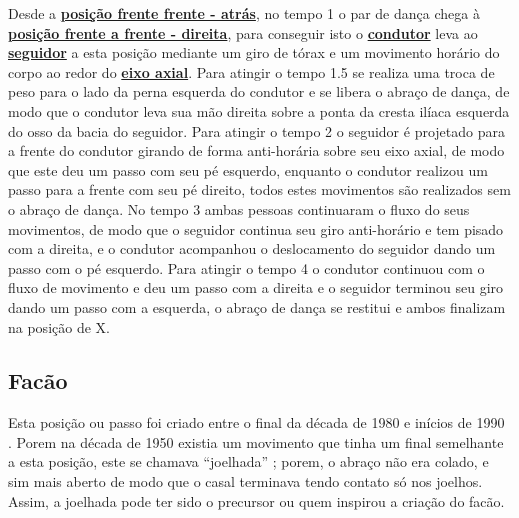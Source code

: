 Desde a \hyperref[def:ffa-position]{\textbf{posição frente frente - atrás}},
no tempo 1 o par de dança chega à \hyperref[def:ffd-position]{\textbf{posição frente a frente - direita}},
para conseguir isto o \hyperref[def:Condutor]{\textbf{condutor}} 
leva ao \hyperref[def:Seguidor]{\textbf{seguidor}} a esta posição
 mediante um giro de tórax e um movimento horário do corpo 
ao redor do \hyperref[def:EixoAxial]{\textbf{eixo axial}}.
Para atingir o tempo 1.5 se realiza uma troca de peso para o lado da perna esquerda do condutor
e se libera o abraço de dança, de modo que o condutor leva sua mão direita
sobre a ponta da cresta ilíaca esquerda do osso da bacia do seguidor.
Para atingir o tempo 2 o seguidor é projetado para a frente do condutor 
girando de forma anti-horária sobre seu eixo axial, de modo que este deu um passo 
com seu pé esquerdo, enquanto o condutor realizou um passo para a frente com seu pé direito,
todos estes movimentos são realizados sem o abraço de dança.
No tempo 3 ambas pessoas continuaram o fluxo do seus movimentos,
de modo que o seguidor continua seu giro anti-horário e tem pisado com a direita,
e o condutor acompanhou o deslocamento do seguidor dando um passo com o pé esquerdo.
Para atingir o tempo 4 o condutor continuou com o fluxo de movimento e deu 
um passo com a direita e o seguidor terminou seu giro dando um passo com a esquerda,
o abraço de dança se restitui e ambos finalizam na posição de X.

\subsection{Facão}
\label{subsec:desc:passo:facao}

\caracterpostura{\CheckedItem}{\NoCheckedItem}
Esta posição ou passo foi  criado entre o final da década de 1980 e inícios de 1990  \cite[pp. 143]{perna2002samba}.
Porem na década de 1950 existia um movimento que tinha um final semelhante a esta posição, 
este se chamava ``joelhada'' \cite[pp. 160]{fornaciari1950aprender};
porem, o abraço  não era colado,
e sim mais aberto de modo que o casal terminava tendo contato só nos joelhos.
Assim, a joelhada pode ter sido o precursor ou quem inspirou a criação do facão.

